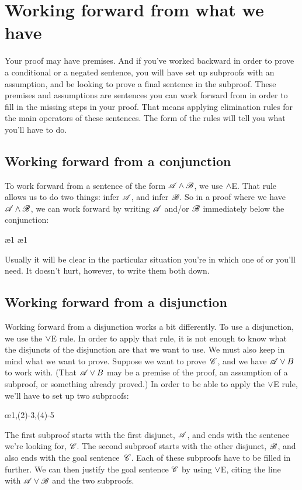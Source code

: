\section{Working forward from what we have}

Your proof may have premises. And if you've worked backward in order to prove a conditional or a negated sentence, you will have set up subproofs with an assumption, and be looking to prove a final sentence in the subproof. These premises and assumptions are sentences you can work forward from in order to fill in the missing steps in your proof. That means applying elimination rules for the main operators of these sentences. The form of the rules will tell you what you'll have to do.

\subsection*{Working forward from a conjunction}

To work forward from a sentence of the form $\mathscr{A} \wedge \mathscr{B}$, we use $\wedge$E. That rule allows us to do two things: infer $\mathscr{A}$, and infer $\mathscr{B}$. So in a proof where we have $\mathscr{A} \wedge \mathscr{B}$, we can work forward by writing $\mathscr{A}$ and/or $\mathscr{B}$ immediately below the conjunction:
\begin{fitchproof}
  \ae{1}
  \ae{1}
\end{fitchproof}
Usually it will be clear in the particular situation you're in which one of  or  you'll need. It doesn't hurt, however, to write them both down.

\subsection*{Working forward from a disjunction}

Working forward from a disjunction works a bit differently. To use a disjunction, we use the $\vee$E rule. In order to apply that rule, it is not enough to know what the disjuncts of the disjunction are that we want to use. We must also keep in mind what we want to prove. Suppose we want to prove~$\mathscr{C}$, and we have $\mathscr{A} \vee B$ to work with. (That $\mathscr{A} \vee B$ may be a premise of the proof, an assumption of a subproof, or something already proved.) In order to be able to apply the $\vee$E rule, we'll have to set up two subproofs:
\begin{fitchproof}
	\open
	\ellipsesline 
	\close 
	\open
	\ellipsesline
	\close
	\oe{1,(2)-3,(4)-5} 
\end{fitchproof} 
The first subproof starts with the first disjunct, $\mathscr{A}$, and ends with the sentence we're looking for, $\mathscr{C}$. The second subproof starts with the other disjunct, $\mathscr{B}$, and also ends with the goal sentence~$\mathscr{C}$. Each of these subproofs have to be filled in further. We can then justify the goal sentence $\mathscr{C}$ by using $\vee$E, citing the line with $\mathscr{A} \vee \mathscr{B}$ and the two subproofs.

